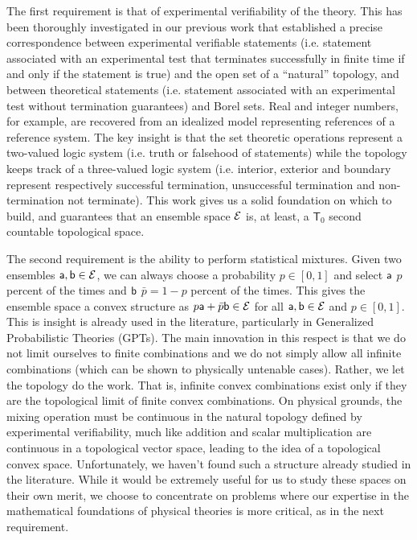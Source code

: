The first requirement is that of experimental verifiability of the theory. This has been thoroughly investigated in our previous work that established a precise correspondence between experimental verifiable statements (i.e. statement associated with an experimental test that terminates successfully in finite time if and only if the statement is true) and the open set of a ``natural'' topology, and between theoretical statements (i.e. statement associated with an experimental test without termination guarantees) and Borel sets. Real and integer numbers, for example, are recovered from an idealized model representing references of a reference system. The key insight is that the set theoretic operations represent a two-valued logic system (i.e. truth or falsehood of statements) while the topology keeps track of a three-valued logic system (i.e. interior, exterior and boundary represent respectively successful termination, unsuccessful termination and non-termination not terminate). This work gives us a solid foundation on which to build, and guarantees that an ensemble space $\Ens$ is, at least, a $\mathsf{T}_0$ second countable topological space.

The second requirement is the ability to perform statistical mixtures. Given two ensembles $\ens[a], \ens[b] \in \Ens$, we can always choose a probability $p \in [0,1]$ and select $\ens[a]$ $p$ percent of the times and $\ens[b]$ $\bar{p} = 1-p$ percent of the times. This gives the ensemble space a convex structure as $p \ens[a] + \bar{p} \ens[b] \in \Ens$ for all $\ens[a], \ens[b] \in \Ens$ and $p \in [0,1]$. This is insight is already used in the literature, particularly in Generalized Probabilistic Theories (GPTs). The main innovation in this respect is that we do not limit ourselves to finite combinations and we do not simply allow all infinite combinations (which can be shown to physically untenable cases). Rather, we let the topology do the work. That is, infinite convex combinations exist only if they are the topological limit of finite convex combinations. On physical grounds, the mixing operation must be continuous in the natural topology defined by experimental verifiability, much like addition and scalar multiplication are continuous in a topological vector space, leading to the idea of a topological convex space. Unfortunately, we haven't found such a structure already studied in the literature. While it would be extremely useful for us to study these spaces on their own merit, we choose to concentrate on problems where our expertise in the mathematical foundations of physical theories is more critical, as in the next requirement.

